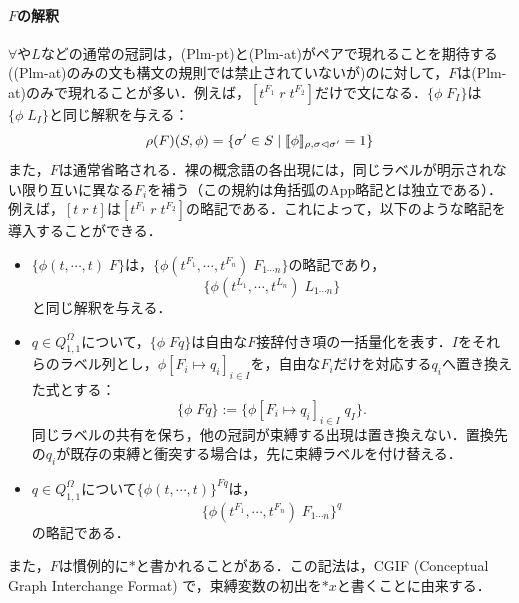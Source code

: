 \documentclass[../../main-detail.tex]{subfiles}
\begin{document}
\paragraph{$F$の解釈} $\forall$や$L$などの通常の冠詞は，(Plm-pt)と(Plm-at)がペアで現れることを期待する((Plm-at)のみの文も構文の規則では禁止されていないが)のに対して，$F$は(Plm-at)のみで現れることが多い．例えば，$[t^{F_1}\; r\; t^{F_2}]$だけで文になる．$\{\phi\; F_I\}$は$\{\phi\; L_I\}$と同じ解釈を与える：
\[\rho(F)(S, \phi) = \{\sigma' \in S\mid \llbracket \phi \rrbracket_{\rho, \sigma\vartriangleleft\sigma'} = 1\}\]
また，$F$は通常省略される．裸の概念語の各出現には，同じラベルが明示されない限り互いに異なる$F_i$を補う（この規約は角括弧のApp略記とは独立である）．例えば，$[t\; r\; t]$は$[t^{F_1}\; r\; t^{F_2}]$の略記である．これによって，以下のような略記を導入することができる．
\begin{itemize}
    \item $\{\phi(t,\cdots,t)\; F\}$は，$\{\phi(t^{F_1},\cdots,t^{F_n})\; F_{1\cdots n}\}$の略記であり，$$\{\phi(t^{L_1},\cdots,t^{L_n})\; L_{1\cdots n}\}$$と同じ解釈を与える．
    \item $q\in Q^\Omega_{1,1}$について，$\{\phi\;Fq\}$は自由な$F$接辞付き項の一括量化を表す．$I$をそれらのラベル列とし，$\phi[F_i\mapsto q_i]_{i\in I}$を，自由な$F_i$だけを対応する$q_i$へ置き換えた式とする：
    \[
        \{\phi\;Fq\}:=\{\phi[F_i\mapsto q_i]_{i\in I}\;q_I\}.
    \]
    同じラベルの共有を保ち，他の冠詞が束縛する出現は置き換えない．置換先の$q_i$が既存の束縛と衝突する場合は，先に束縛ラベルを付け替える．
    \item $q\in Q^\Omega_{1,1}$について$\{\phi(t,\cdots,t)\}^{Fq}$は，
    $$\{\phi(t^{F_1},\cdots,t^{F_n})\; F_{1\cdots n}\}^q$$
    の略記である．
\end{itemize}

また，$F$は慣例的に$*$と書かれることがある．この記法は，CGIF (Conceptual Graph Interchange Format) で，束縛変数の初出を$*x$と書くことに由来する．
\end{document}
